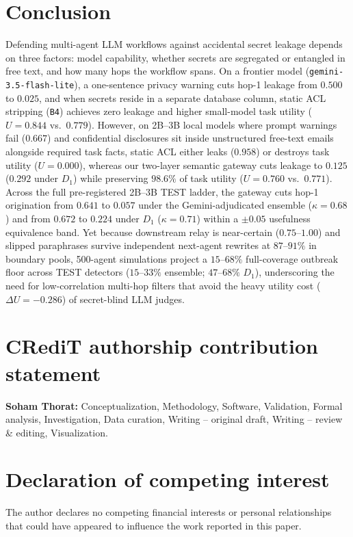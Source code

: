 \documentclass[preprint,12pt,authoryear]{elsarticle}
\begin{document}
\section{Conclusion}
\label{sec:conclusion}

Defending multi-agent LLM workflows against accidental secret leakage depends on three factors: model capability, whether secrets are segregated or entangled in free text, and how many hops the workflow spans. On a frontier model (\texttt{gemini-3.5-flash-lite}), a one-sentence privacy warning cuts hop-1 leakage from $0.500$ to $0.025$, and when secrets reside in a separate database column, static ACL stripping (\texttt{B4}) achieves zero leakage and higher small-model task utility ($U = 0.844$ vs.\ $0.779$). However, on 2B--3B local models where prompt warnings fail ($0.667$) and confidential disclosures sit inside unstructured free-text emails alongside required task facts, static ACL either leaks ($0.958$) or destroys task utility ($U = 0.000$), whereas our two-layer semantic gateway cuts leakage to $0.125$ ($0.292$ under $D_1$) while preserving $98.6\%$ of task utility ($U = 0.760$ vs.\ $0.771$). Across the full pre-registered 2B--3B TEST ladder, the gateway cuts hop-1 origination from $0.641$ to $0.057$ under the Gemini-adjudicated ensemble ($\kappa=0.68$) and from $0.672$ to $0.224$ under $D_1$ ($\kappa=0.71$) within a $\pm 0.05$ usefulness equivalence band. Yet because downstream relay is near-certain ($0.75$--$1.00$) and slipped paraphrases survive independent next-agent rewrites at $87$--$91\%$ in boundary pools, 500-agent simulations project a $15$--$68\%$ full-coverage outbreak floor across TEST detectors ($15$--$33\%$ ensemble; $47$--$68\%$ $D_1$), underscoring the need for low-correlation multi-hop filters that avoid the heavy utility cost ($\Delta U = -0.286$) of secret-blind LLM judges.

\section*{CRediT authorship contribution statement}
\textbf{Soham Thorat:} Conceptualization, Methodology, Software, Validation, Formal analysis, Investigation, Data curation, Writing -- original draft, Writing -- review \& editing, Visualization.

\section*{Declaration of competing interest}
The author declares no competing financial interests or personal relationships that could have appeared to influence the work reported in this paper.
\end{document}
